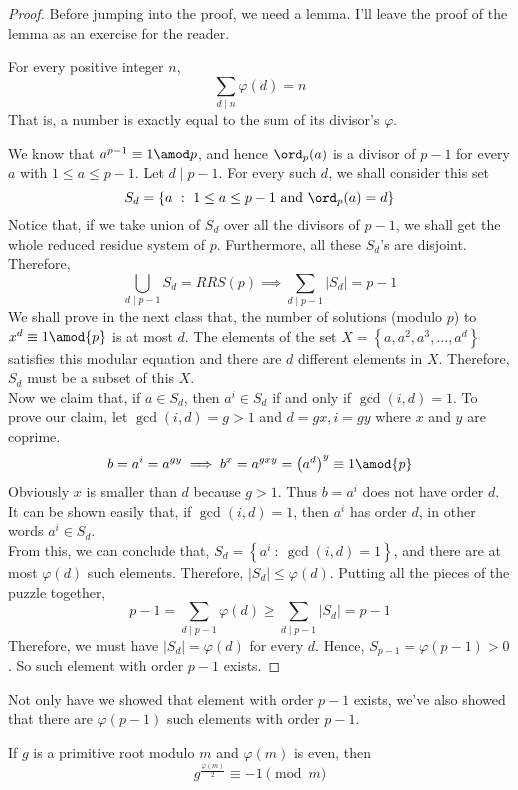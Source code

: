 \documentclass[11pt]{scrartcl}
\begin{document}
\begin{proof}
Before jumping into the proof, we need a lemma. I'll leave the proof of the lemma as an exercise for the reader.
\begin{lemma}
For every positive integer \(n\),
\[\sum_{d \mid n} \varphi(d) = n\]
That is, a number is exactly equal to the sum of its divisor's \(\varphi\).
\end{lemma}
We know that \(a^{p-1} \equiv 1 \amod p\), and hence \(\ord_p(a)\) is a divisor of \(p-1\) for every \(a\) with \(1\leq a \leq p-1\). Let \(d \mid p-1\). For every such \(d\), we shall consider this set
\[S_d = \left\{ a \ : \ 1\leq a \leq p-1 \text{ and } \ord_p(a) = d\right\}\]
Notice that, if we take union of \(S_d\) over all the divisors of \(p-1\), we shall get the whole reduced residue system of \(p\). Furthermore, all these \(S_d\)'s are disjoint. Therefore,
\[ \bigcup_{d \mid p-1} S_d = RRS(p) \implies \boxed{\sum_{d \mid p-1} |S_d| = p-1} \]
We shall prove in the next class that, the number of solutions (modulo \(p\)) to \(x^d \equiv 1 \amod{p}\) is at most \(d\). The elements of the set \(X = \left\{ a, a^2, a^3, \ldots, a^d \right\} \) satisfies this modular equation and there are \(d\) different elements in \(X\). Therefore, \(S_d\) must be a subset of this \(X\).\\
Now we claim that, if \(a\in S_d\), then \(a^{i} \in S_d\) if and only if \(\gcd(i,d)=1\). To prove our claim, let \(\gcd(i,d) = g >1\) and \(d = gx, i=gy\) where \(x\) and \(y\) are coprime. 
\[ b = a^{i} = a^{gy} \implies b^{x} = a^{gxy} = \left(a^d\right)^y \equiv 1 \amod{p}\]
Obviously \(x\) is smaller than \(d\) because \(g>1\). Thus \(b=a^{i}\) does not have order \(d\). It can be shown easily that, if \(\gcd(i,d) = 1\), then \(a^{i}\) has order \(d\), in other words \(a^{i} \in S_d\). \\
From this, we can conclude that, \(S_d = \left\{ a^{i} \ : \ \gcd(i,d)=1 \right\} \), and there are at most \(\varphi(d)\) such elements. Therefore, \(|S_d| \leq \varphi(d)\). Putting all the pieces of the puzzle together,
\[ p-1 = \sum_{d \mid p-1} \varphi(d) \geq \sum_{d \mid p-1} |S_d| = p-1\]
Therefore, we must have \(|S_d| = \varphi(d)\) for every \(d\). Hence, \(S_{p-1} = \varphi(p-1) >0\). So such element with order \(p-1\) exists.
\end{proof}
Not only have we showed that element with order \(p-1\) exists, we've also showed that there are \(\varphi(p-1)\) such elements with order \(p-1\).
\begin{lemma}
If \(g\) is a primitive root modulo \(m\) and \(\varphi(m)\) is even, then
\[g^{\frac{\varphi(m)}{2}} \equiv -1 \pmod{m}\]
\end{lemma}
\end{document}
